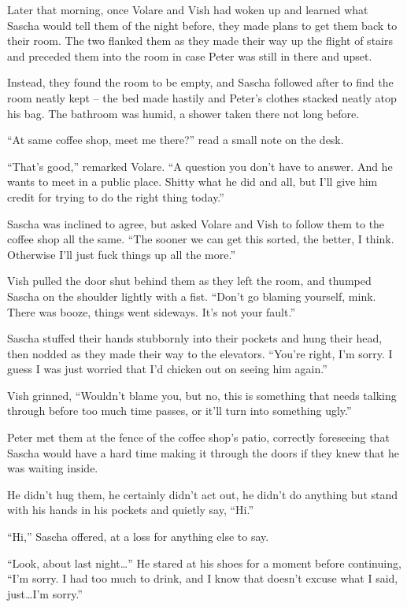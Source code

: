 \secdiv{}

Later that morning, once Volare and Vish had woken up and learned what Sascha would tell them of the night before, they made plans to get them back to their room. The two flanked them as they made their way up the flight of stairs and preceded them into the room in case Peter was still in there and upset.

Instead, they found the room to be empty, and Sascha followed after to find the room neatly kept -- the bed made hastily and Peter's clothes stacked neatly atop his bag. The bathroom was humid, a shower taken there not long before.

``At same coffee shop, meet me there?'' read a small note on the desk.

``That's good,'' remarked Volare. ``A question you don't have to answer. And he wants to meet in a public place. Shitty what he did and all, but I'll give him credit for trying to do the right thing today.''

Sascha was inclined to agree, but asked Volare and Vish to follow them to the coffee shop all the same. ``The sooner we can get this sorted, the better, I think. Otherwise I'll just fuck things up all the more.''

Vish pulled the door shut behind them as they left the room, and thumped Sascha on the shoulder lightly with a fist. ``Don't go blaming yourself, mink. There was booze, things went sideways. It's not your fault.''

Sascha stuffed their hands stubbornly into their pockets and hung their head, then nodded as they made their way to the elevators. ``You're right, I'm sorry. I guess I was just worried that I'd chicken out on seeing him again.''

Vish grinned, ``Wouldn't blame you, but no, this is something that needs talking through before too much time passes, or it'll turn into something ugly.''

\secdiv{}

Peter met them at the fence of the coffee shop's patio, correctly foreseeing that Sascha would have a hard time making it through the doors if they knew that he was waiting inside.

He didn't hug them, he certainly didn't act out, he didn't do anything but stand with his hands in his pockets and quietly say, ``Hi.''

``Hi,'' Sascha offered, at a loss for anything else to say.

``Look, about last night\ldots{}'' He stared at his shoes for a moment before continuing, ``I'm sorry. I had too much to drink, and I know that doesn't excuse what I said, just\ldots{}I'm sorry.''

